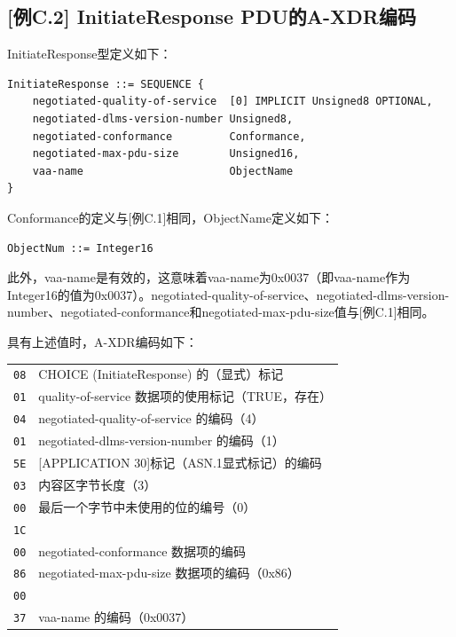 \documentclass[a4paper,11pt]{ctexart}
\begin{document}
\subsection{[例C.2] InitiateResponse PDU的A-XDR编码}

InitiateResponse型定义如下：
\begin{verbatim}
InitiateResponse ::= SEQUENCE {
    negotiated-quality-of-service  [0] IMPLICIT Unsigned8 OPTIONAL,
    negotiated-dlms-version-number Unsigned8,
    negotiated-conformance         Conformance,
    negotiated-max-pdu-size        Unsigned16,
    vaa-name                       ObjectName
}
\end{verbatim}

\noindent Conformance的定义与[例C.1]相同，ObjectName定义如下：
\begin{verbatim}
ObjectNum ::= Integer16
\end{verbatim}

\noindent 此外，vaa-name是有效的，这意味着vaa-name为0x0037（即vaa-name作为Integer16的值为0x0037）。negotiated-quality-of-service、negotiated-dlms-version-number、negotiated-conformance和negotiated-max-pdu-size值与[例C.1]相同。

具有上述值时，A-XDR编码如下：

\begin{center}
\begin{tabular}{ll}
\texttt{08} & CHOICE (InitiateResponse) 的（显式）标记 \\
\texttt{01} & quality-of-service 数据项的使用标记（TRUE，存在）\\
\texttt{04} & negotiated-quality-of-service 的编码（4）\\
\texttt{01} & negotiated-dlms-version-number 的编码（1）\\
\texttt{5E} & [APPLICATION 30]标记（ASN.1显式标记）的编码 \\
\texttt{03} & 内容区字节长度（3）\\
\texttt{00} & 最后一个字节中未使用的位的编号（0）\\
\texttt{1C} & \\
\texttt{00} & negotiated-conformance 数据项的编码 \\
\texttt{86} & negotiated-max-pdu-size 数据项的编码（0x86）\\
\texttt{00} & \\
\texttt{37} & vaa-name 的编码（0x0037）\\
\end{tabular}
\end{center}
\end{document}
